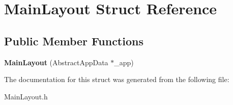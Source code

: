 \hypertarget{struct_main_layout}{
\section{MainLayout Struct Reference}
\label{struct_main_layout}
}
\subsection*{Public Member Functions}
\begin{DoxyCompactItemize}
\item 
\hypertarget{struct_main_layout_a149898e888a7519a9c040654a7e3621e}{
{\bfseries MainLayout} (AbstractAppData $\ast$\_\-app)}
\label{struct_main_layout_a149898e888a7519a9c040654a7e3621e}

\end{DoxyCompactItemize}


The documentation for this struct was generated from the following file:\begin{DoxyCompactItemize}
\item 
MainLayout.h\end{DoxyCompactItemize}
